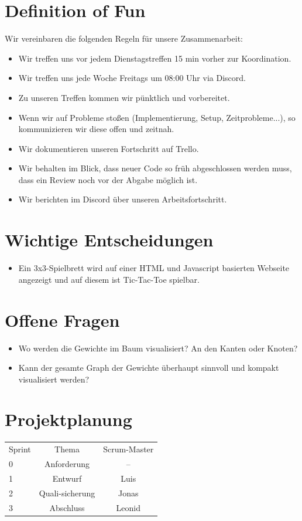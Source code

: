 \documentclass[titlepage]{scrartcl}
\begin{document}
\section{Definition of Fun}%
Wir vereinbaren die folgenden Regeln für unsere Zusammenarbeit:
\begin{itemize}
	\item Wir treffen uns vor jedem Dienstagstreffen 15 min vorher zur Koordination.
	\item Wir treffen uns jede Woche Freitags um 08:00 Uhr via Discord.
	\item Zu unseren Treffen kommen wir pünktlich und vorbereitet.
	\item Wenn wir auf Probleme stoßen (Implementierung, Setup, Zeitprobleme...), so kommunizieren wir diese offen und zeitnah.
	\item Wir dokumentieren unseren Fortschritt auf Trello.
	\item Wir behalten im Blick, dass neuer Code so früh abgeschlossen werden muss, dass ein Review noch vor der Abgabe möglich ist.
	\item Wir berichten im Discord über unseren Arbeitsfortschritt.
\end{itemize}

\section{Wichtige Entscheidungen}
\begin{itemize}
\item Ein 3x3-Spielbrett wird auf einer HTML und Javascript basierten Webseite angezeigt und auf diesem ist Tic-Tac-Toe spielbar.
\end{itemize}

\section{Offene Fragen}
\begin{itemize}
	\item Wo werden die Gewichte im Baum visualisiert? An den Kanten oder Knoten?
	\item Kann der gesamte Graph der Gewichte überhaupt sinnvoll und kompakt visualisiert werden?
\end{itemize}


\section{Projektplanung}%
\begin{tabular}{lcc}
	Sprint &Thema& Scrum-Master\\
	0&Anforderung&--\\
	1&Entwurf & Luis\\
	2&Quali-sicherung & Jonas \\
	3&Abschluss & Leonid\\
\end{tabular}
\end{document}
